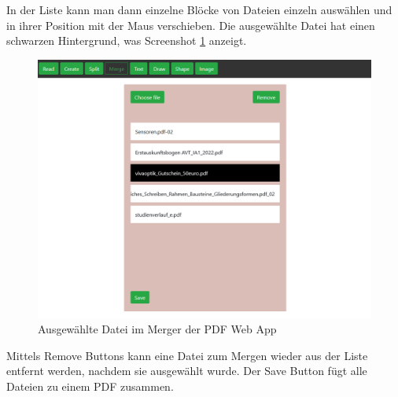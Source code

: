 In der Liste kann man dann einzelne Blöcke von Dateien einzeln auswählen und in ihrer Position mit der Maus verschieben. Die ausgewählte Datei hat einen schwarzen Hintergrund, was Screenshot \ref{fig:mergelist-selected} anzeigt.
\begin{figure}[!htbp]
	\centering
	\includegraphics[width=1\textwidth]{"images/mergelist-selected.png"}
	\caption{Ausgewählte Datei im Merger der PDF Web App}
	\label{fig:mergelist-selected}
\end{figure}
Mittels Remove Buttons kann eine Datei zum Mergen wieder aus der Liste entfernt werden, nachdem sie ausgewählt wurde. Der Save Button fügt alle Dateien zu einem PDF zusammen.




